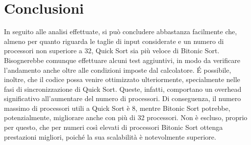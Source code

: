 \chapter{Conclusioni}
In seguito alle analisi effettuate, si può concludere abbastanza facilmente che, almeno per quanto riguarda le taglie di input considerate e un numero di processori non superiore a 32, Quick Sort sia più veloce di Bitonic Sort. Bisognerebbe comunque effettuare alcuni test aggiuntivi, in modo da verificare l'andamento anche oltre alle condizioni imposte dal calcolatore.
\'E possibile, inoltre, che il codice possa venire ottimizzato ulteriormente, specialmente nelle fasi di sincronizzazione di Quick Sort. Queste, infatti, comportano un overhead significativo all'aumentare del numero di processori. Di conseguenza, il numero massimo di processori utili a Quick Sort è 8, mentre Bitonic Sort potrebbe, potenzialmente, migliorare anche con più di 32 processori. Non è escluso, proprio per questo, che per numeri così elevati di processori Bitonic Sort ottenga prestazioni migliori, poiché la sua scalabilità è notevolmente superiore.